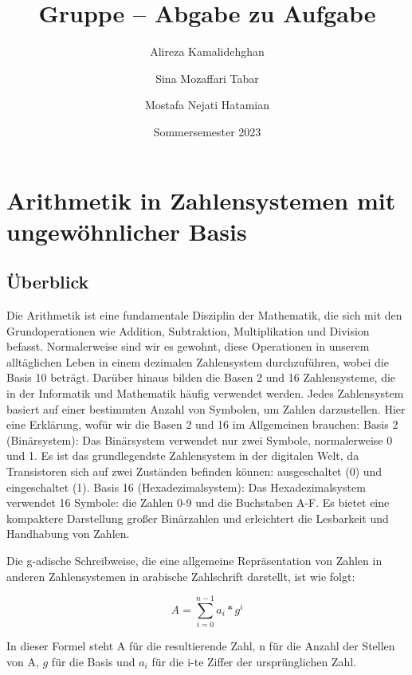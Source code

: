 \documentclass[course=erap]{aspdoc}
\author{Alireza Kamalidehghan \and Sina Mozaffari Tabar \and Mostafa Nejati Hatamian}
\date{Sommersemester 2023} %
\title{Gruppe \theGroup{} -- Abgabe zu Aufgabe \theNumber}
\begin{document}
    \maketitle


    \section{Arithmetik in Zahlensystemen mit ungewöhnlicher Basis}

    \subsection{Überblick}
    Die Arithmetik ist eine fundamentale Disziplin der Mathematik, die sich mit den Grundoperationen wie Addition, Subtraktion, Multiplikation und Division befasst.
    Normalerweise sind wir es gewohnt, diese Operationen in unserem alltäglichen Leben in einem dezimalen Zahlensystem durchzuführen, wobei die Basis 10 beträgt.
    \newline
    Darüber hinaus bilden die Basen 2 und 16 Zahlensysteme, die in der Informatik und Mathematik häufig verwendet werden.
    Jedes Zahlensystem basiert auf einer bestimmten Anzahl von Symbolen, um Zahlen darzustellen.
    Hier eine Erklärung, wofür wir die Basen 2 und 16 im Allgemeinen brauchen:
    \newline
    \newline
    Basis 2 (Binärsystem):
    Das Binärsystem verwendet nur zwei Symbole, normalerweise 0 und 1.
    Es ist das grundlegendste Zahlensystem in der digitalen Welt, da Transistoren sich auf zwei Zuständen befinden können: ausgeschaltet (0) und eingeschaltet (1).
    \newline
    \newline
    Basis 16 (Hexadezimalsystem):
    Das Hexadezimalsystem verwendet 16 Symbole: die Zahlen 0-9 und die Buchstaben A-F. Es bietet eine kompaktere Darstellung großer Binärzahlen und erleichtert die Lesbarkeit und Handhabung von Zahlen.
    \newline
    \par
    Die g-adische Schreibweise, die eine allgemeine Repräsentation von Zahlen in anderen Zahlensystemen in arabische Zahlschrift darstellt, ist wie folgt:

    \begin{equation}
        \label{sumFormel}
        A = \sum_{i=0} ^{n-1} a_i * g^i
    \end{equation}


    In dieser Formel steht A für die resultierende Zahl, n für die Anzahl der Stellen von A, $g$ für die Basis und $a_i$ für die i-te Ziffer der ursprünglichen Zahl.
    \newline
\end{document}
